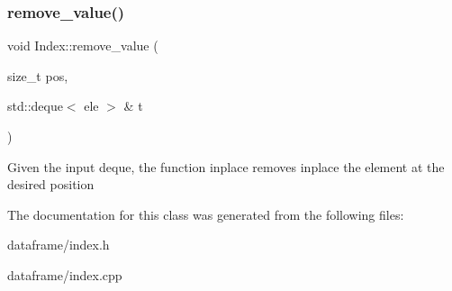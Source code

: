 \subsubsection{\texorpdfstring{remove\+\_\+value()}{remove\_value()}}
{\footnotesize\ttfamily void Index\+::remove\+\_\+value (\begin{DoxyParamCaption}\item[{size\+\_\+t}]{pos,  }\item[{std\+::deque$<$ ele $>$ \&}]{t }\end{DoxyParamCaption})\hspace{0.3cm}{\ttfamily [private]}}

Given the input deque, the function inplace removes inplace the element at the desired position 

The documentation for this class was generated from the following files\+:\begin{DoxyCompactItemize}
\item 
dataframe/index.\+h\item 
dataframe/index.\+cpp\end{DoxyCompactItemize}
